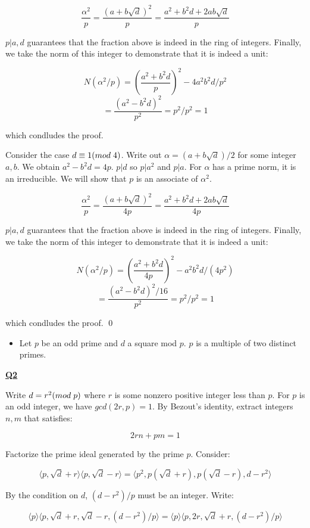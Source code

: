 \documentclass{article}
\newcommand{\new}[1]{
    \vspace{2mm}
    \noindent
    \textbf{
    \underline{#1}}
}
\def\_{{\hspace{1mm}}}
\newcommand{\<}{{{
    \langle
}}}
\def\>{{{
    \rangle
}}}
\begin{document}
\[
    \frac{\alpha^2}{p} = 
    \frac{(a+b\sqrt{d})^2}{p} = 
    \frac{a^2+b^2d+2ab\sqrt{d}}{p}
\]

$p|a, d$ guarantees that the fraction above is indeed in the ring of 
integers. Finally, we take the norm of this integer to demonstrate 
that it is indeed a unit:

\[
    N(\alpha^2/p) = 
    \left(
        \frac{a^2+b^2d}{p}
    \right)^2
    -4 a^2 b^2d/p^2
\]
\[
    = \frac{(a^2 - b^2d)^2}{p^2}
    = p^2/p^2 = 1
\]

which condludes the proof. 

Consider the case $d \equiv 1 (mod \_ 4)$. 
Write out $\alpha  = (a+b\sqrt{d})/2$ for some integer $a, b$. We obtain 
$a^2-b^2d = 4p$. $p|d$ so $p|a^2$ and $p|a$. For $\alpha$ has a prime norm, it is an irreducible. 
We will show that $p$ is an associate of $\alpha^2$. 

\[
    \frac{\alpha^2}{p} = 
    \frac{(a+b\sqrt{d})^2}{4p} = 
    \frac{a^2+b^2d+2ab\sqrt{d}}{4p}
\]

$p|a, d$ guarantees that the fraction above is indeed in the ring of 
integers. Finally, we take the norm of this integer to demonstrate 
that it is indeed a unit:

\[
    N(\alpha^2/p) = 
    \left(
        \frac{a^2+b^2d}{4p}
    \right)^2
    -a^2 b^2d/(4p^2)
\]
\[
    = \frac{(a^2 - b^2d)^2/16}{p^2}
    = p^2/p^2 = 1
\]

which condludes the proof.
\qed

\newpage

\begin{itemize}
    \item Let $p$ be an odd prime and $d$ a square mod $p$. 
    $p$ is a multiple of two distinct primes. 
\end{itemize}

\new{Q2}
Write $d = r^2 (mod\_ p)$ where $r$ is some 
nonzero positive integer less than $p$. For $p$ is 
an odd integer, we have $gcd(2r, p) = 1$. By Bezout's identity, 
extract integers $n, m$ that satisfies:

\[
    2rn + pm = 1
\]

Factorize the prime ideal generated by the prime $p$. Consider:

\[
    \<p, \sqrt{d} + r\>\<p, \sqrt{d} - r\>
    = \<p^2, p(\sqrt{d}+r), p(\sqrt{d} - r), d - r^2\>
\]

By the condition on $d$, $(d-r^2)/p$ must be an integer. Write:

\[
    \<p\>\<p, \sqrt{d}+r, \sqrt{d}-r, (d-r^2)/p\>
    =
    \<p\>\<p, 2r, \sqrt{d}+r, (d-r^2)/p\>
\]
\end{document}
